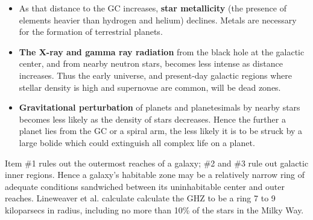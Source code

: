 \begin{frame}
\begin{itemize}
\item As that distance to the GC increases, {\bf star metallicity} (the presence of elements heavier than hydrogen and helium) declines. Metals are necessary for the formation of terrestrial planets.
\item {\bf The X-ray and gamma ray radiation} from the black hole at the galactic center, and from nearby neutron stars, becomes less intense as distance increases. Thus the early universe, and present-day galactic regions where stellar density is high and supernovae are common, will be dead zones.
\item{\bf Gravitational perturbation} of planets and planetesimals by nearby stars becomes less likely as the density of stars decreases. Hence the further a planet lies from the GC or a spiral arm, the less likely it is to be struck by a large bolide which could extinguish all complex life on a planet.
\end{itemize}

\vspace{0.5cm}
\begin{block}{}
Item \#1 rules out the outermost reaches of a galaxy; \#2 and \#3 rule out galactic inner regions. Hence a galaxy's habitable zone may be a relatively narrow ring of adequate conditions sandwiched between its uninhabitable center and outer reaches. Lineweaver et al. calculate calculate the GHZ to be a ring 7 to 9 kiloparsecs in radius, including no more than 10\% of the stars in the Milky Way.
\end{block}
\end{frame}


